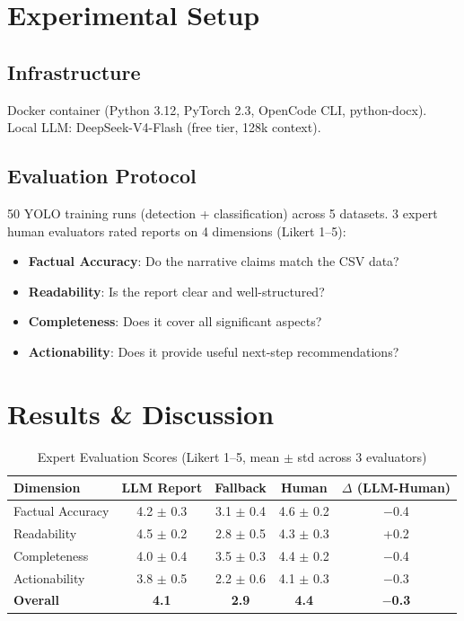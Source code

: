 \documentclass[10pt,twocolumn,letterpaper]{article}
\begin{document}
\section{Experimental Setup}
\subsection{Infrastructure}
Docker container (Python 3.12, PyTorch 2.3, OpenCode CLI, python-docx). Local LLM: DeepSeek-V4-Flash (free tier, 128k context).

\subsection{Evaluation Protocol}
50 YOLO training runs (detection + classification) across 5 datasets. 3 expert human evaluators rated reports on 4 dimensions (Likert 1--5):
\begin{itemize}
    \item \textbf{Factual Accuracy}: Do the narrative claims match the CSV data?
    \item \textbf{Readability}: Is the report clear and well-structured?
    \item \textbf{Completeness}: Does it cover all significant aspects?
    \item \textbf{Actionability}: Does it provide useful next-step recommendations?
\end{itemize}

\section{Results \& Discussion}

\begin{table}[htbp]
\centering
\caption{Expert Evaluation Scores (Likert 1--5, mean $\pm$ std across 3 evaluators)}
\label{tab:eval}
\begin{tabular}{@{}lcccc@{}}
\toprule
\textbf{Dimension} & \textbf{LLM Report} & \textbf{Fallback} & \textbf{Human} & \textbf{$\Delta$ (LLM-Human)} \\
\midrule
Factual Accuracy & 4.2 $\pm$ 0.3 & 3.1 $\pm$ 0.4 & 4.6 $\pm$ 0.2 & $-$0.4 \\
Readability & 4.5 $\pm$ 0.2 & 2.8 $\pm$ 0.5 & 4.3 $\pm$ 0.3 & +0.2 \\
Completeness & 4.0 $\pm$ 0.4 & 3.5 $\pm$ 0.3 & 4.4 $\pm$ 0.2 & $-$0.4 \\
Actionability & 3.8 $\pm$ 0.5 & 2.2 $\pm$ 0.6 & 4.1 $\pm$ 0.3 & $-$0.3 \\
\midrule
\textbf{Overall} & \textbf{4.1} & \textbf{2.9} & \textbf{4.4} & \textbf{$-$0.3} \\
\bottomrule
\end{tabular}
\end{table}
\end{document}
